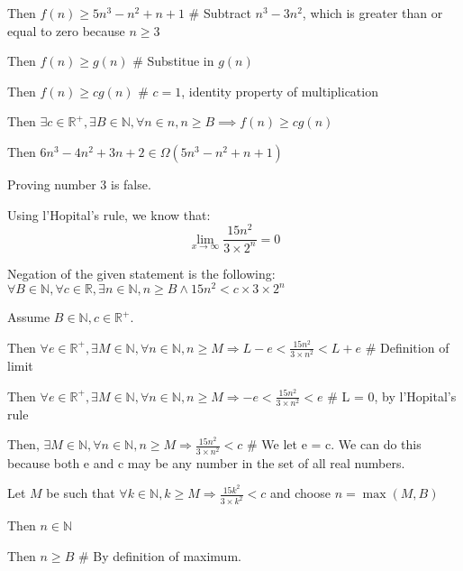 \documentclass{article}
\begin{document}
\begin{enumerate}
\begin{description}
\begin{description}
		\item Then $f(n) \geq 5n^3 - n^2 + n + 1$ \# Subtract $n^3 - 3n^2$, which is greater than or equal to zero because $n \geq 3$
		\item Then $f(n) \geq g(n)$ \# Substitue in $g(n)$
		\item Then $f(n) \geq cg(n)$ \# $c = 1$, identity property of multiplication
		\end{description}
	\item Then $\exists c \in \mathbb{R}^+, \exists B \in \mathbb{N}, \forall n \in n, n \geq B \implies f(n) \geq cg(n)$
	\item Then $6n^3 - 4n^2 + 3n + 2 \in \Omega(5n^3 - n^2 + n + 1)$
	\end{description}
	
\item Proving number 3 is false.
	\begin{description}
		\item Using l'Hopital's rule, we know that:	
		\begin{equation*}
		\lim_{x\to\infty}\frac{15n^2}{3 \times 2^n}=0
		\end{equation*}
		\item Negation of the given statement is the following: $\forall B \in \mathbb{N}, \forall c \in \mathbb{R}, \exists n \in \mathbb{N}, n\geq B \wedge 15n^2 < c\times 3 \times 2^n$
		\item Assume $B \in \mathbb{N}, c \in \mathbb{R}^+$.
		\begin{description}
			\item Then $\forall e \in \mathbb{R}^+, \exists M \in \mathbb{N}, \forall n \in \mathbb{N}, n \geq M \Rightarrow L - e < \frac{15n^2}{3\times n^2}< L + e$ \# Definition of limit
			\item Then $\forall e \in \mathbb{R}^+, \exists M \in \mathbb{N}, \forall n \in \mathbb{N}, n \geq M \Rightarrow -e < \frac{15n^2}{3\times n^2}< e$ \# L = 0, by l'Hopital's rule
			\item Then, $\exists M \in \mathbb{N}, \forall n \in \mathbb{N}, n \geq M \Rightarrow \frac{15n^2}{3\times n^2} < c$ \# We let e = c. We can do this because both e and c may be any number in the set of all real numbers.
			\item Let $M$ be such that $\forall k \in \mathbb{N}, k \geq M \Rightarrow \frac{15k^2}{3\times k^2} < c$ and choose $n = \max(M,B)$
			\item Then $n \in \mathbb{N}$
			\item Then $n \geq B$ \# By definition of maximum.

\end{description}
\end{description}
\end{enumerate}
\end{document}
